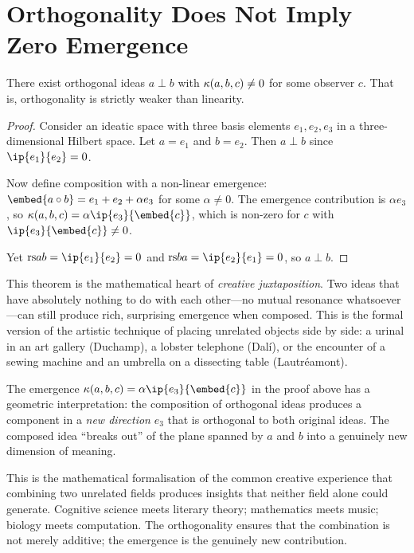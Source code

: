 \section{Orthogonality Does Not Imply Zero Emergence}

\begin{theorem}
\label{thm:orth-emerge}
There exist orthogonal ideas $a \perp b$ with
$\kappa(a, b, c) \neq 0$ for some observer $c$.  That is, orthogonality
is strictly weaker than linearity.
\end{theorem}

\begin{proof}
Consider an ideatic space with three basis elements $e_1, e_2, e_3$
in a three-dimensional Hilbert space.  Let $a = e_1$ and $b = e_2$.
Then $a \perp b$ since $\ip{e_1}{e_2} = 0$.

Now define composition with a non-linear emergence:
$\embed{a \compose b} = e_1 + e_2 + \alpha e_3$ for some $\alpha \neq 0$.
The emergence contribution is $\alpha e_3$, so
$\emerge(a, b, c) = \alpha \ip{e_3}{\embed{c}}$, which is non-zero for
$c$ with $\ip{e_3}{\embed{c}} \neq 0$.

Yet $\rs{a}{b} = \ip{e_1}{e_2} = 0$ and $\rs{b}{a} = \ip{e_2}{e_1} = 0$,
so $a \perp b$.
\end{proof}

\begin{interpretation}
This theorem is the mathematical heart of \emph{creative juxtaposition}.
Two ideas that have absolutely nothing to do with each other---no mutual
resonance whatsoever---can still produce rich, surprising emergence when
composed.  This is the formal version of the artistic technique of placing
unrelated objects side by side: a urinal in an art gallery (Duchamp), a
lobster telephone (Dal\'{i}), or the encounter of a sewing machine and an
umbrella on a dissecting table (Lautr\'{e}amont).

The emergence $\emerge(a, b, c) = \alpha \ip{e_3}{\embed{c}}$ in the proof
above has a geometric interpretation: the composition of orthogonal ideas
produces a component in a \emph{new direction} $e_3$ that is orthogonal to
both original ideas.  The composed idea ``breaks out'' of the plane spanned by
$a$ and $b$ into a genuinely new dimension of meaning.

This is the mathematical formalisation of the common creative experience that
combining two unrelated fields produces insights that neither field alone
could generate.  Cognitive science meets literary theory; mathematics meets
music; biology meets computation.  The orthogonality ensures that the
combination is not merely additive; the emergence is the genuinely new
contribution.
\end{interpretation}

